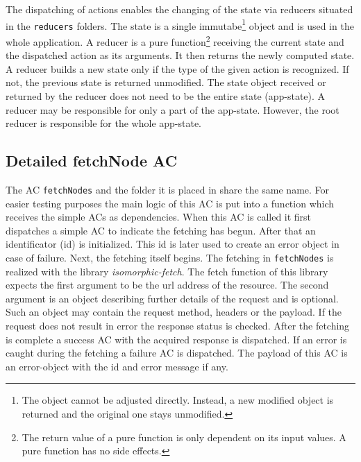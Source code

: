 The dispatching of actions enables the changing of the state via reducers situated in the \texttt{reducers} folders. The state is a single immutabe\footnote{The object cannot be adjusted directly. Instead, a new modified object is returned and the original one stays unmodified.} object and is used in the whole application. A \hypertarget{reducers}{reducer} is a pure function\footnote{The return value of a pure function is only dependent on its input values. A pure function has no side effects.} receiving the current state and the dispatched action as its arguments. It then returns the newly computed state. A reducer builds a new state only if the type of the given action is recognized. If not, the previous state is returned unmodified. The state object received or returned by the reducer does not need to be the entire state (app-state). A reducer may be responsible for only a part of the app-state. However, the root reducer is responsible for the whole app-state.

\subsection{Detailed fetchNode AC}\label{dixComplicatedAC}
The AC \texttt{fetchNodes} and the folder it is placed in share the same name. For easier testing purposes the main logic of this AC is put into a function which receives the simple ACs as dependencies. When this AC is called it first dispatches a simple AC to indicate the fetching has begun. After that an identificator (id) is initialized. This id is later used to create an error object in case of failure. Next, the fetching itself begins. The fetching in \texttt{fetchNodes} is realized with the library \textit{isomorphic-fetch}. The fetch function of this library expects the first argument to be the url address of the resource. The second argument is an object describing further details of the request and is optional. Such an object may contain the request method, headers or the payload. If the request does not result in error the response status is checked. After the fetching is complete a success AC with the acquired response is dispatched. If an error is caught during the fetching a failure AC is dispatched. The payload of this AC is an error-object with the id and error message if any.

